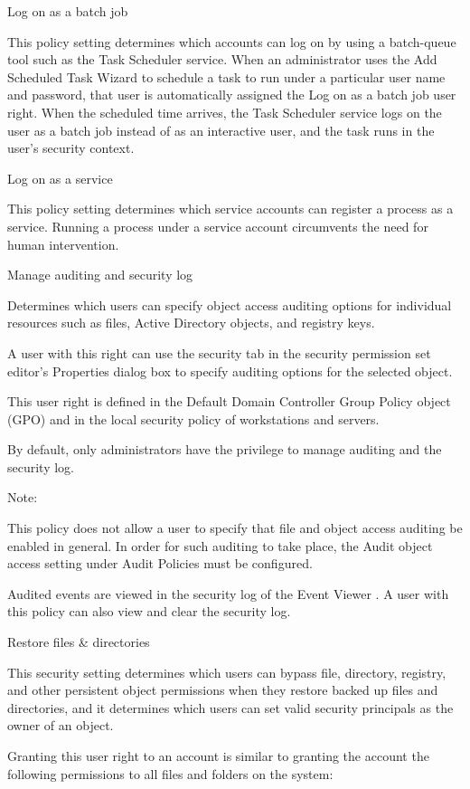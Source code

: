 Log on as a batch job

This policy setting determines which accounts can log on by using a batch-queue tool such as the Task Scheduler service. When an administrator uses the Add Scheduled Task Wizard to schedule a task to run under a particular user name and password, that user is automatically assigned the Log on as a batch job user right. When the scheduled time arrives, the Task Scheduler service logs on the user as a batch job instead of as an interactive user, and the task runs in the user’s security context.

Log on as a service

This policy setting determines which service accounts can register a process as a service. Running a process under a service account circumvents the need for human intervention.

Manage auditing and security log

Determines which users can specify object access auditing options for individual resources such as files, Active Directory objects, and registry keys.

A user with this right can use the security tab in the security permission set editor’s Properties dialog box to specify auditing options for the selected object.

This user right is defined in the Default Domain Controller Group Policy object (GPO) and in the local security policy of workstations and servers.

By default, only administrators have the privilege to manage auditing and the security log.

Note:

This policy does not allow a user to specify that file and object access auditing be enabled in general. In order for such auditing to take place, the Audit object access setting under Audit Policies must be configured.

Audited events are viewed in the security log of the Event Viewer . A user with this policy can also view and clear the security log.

Restore files \& directories

This security setting determines which users can bypass file, directory, registry, and other persistent object permissions when they restore backed up files and directories, and it determines which users can set valid security principals as the owner of an object.

Granting this user right to an account is similar to granting the account the following permissions to all files and folders on the system:

